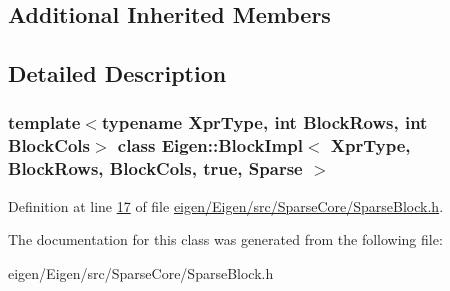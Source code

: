 \subsection*{Additional Inherited Members}


\subsection{Detailed Description}
\subsubsection*{template$<$typename Xpr\+Type, int Block\+Rows, int Block\+Cols$>$\newline
class Eigen\+::\+Block\+Impl$<$ Xpr\+Type, Block\+Rows, Block\+Cols, true, Sparse $>$}



Definition at line \hyperlink{eigen_2_eigen_2src_2_sparse_core_2_sparse_block_8h_source_l00017}{17} of file \hyperlink{eigen_2_eigen_2src_2_sparse_core_2_sparse_block_8h_source}{eigen/\+Eigen/src/\+Sparse\+Core/\+Sparse\+Block.\+h}.



The documentation for this class was generated from the following file\+:\begin{DoxyCompactItemize}
\item 
eigen/\+Eigen/src/\+Sparse\+Core/\+Sparse\+Block.\+h\end{DoxyCompactItemize}
